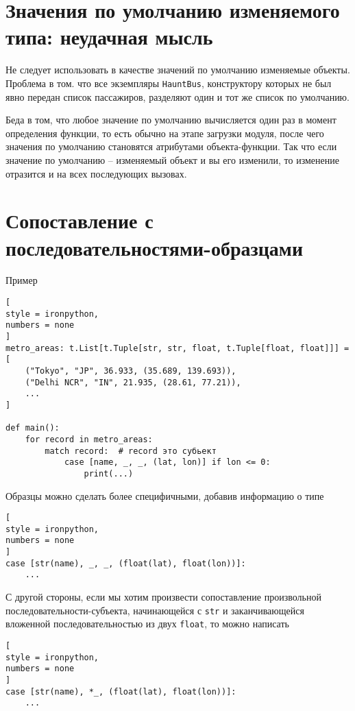 \documentclass[%
	11pt,
	a4paper,
	utf8,
		]{article}
\begin{document}
\section{Значения по умолчанию изменяемого типа: неудачная мысль}

Не следует использовать в качестве значений по умолчанию изменяемые объекты. Проблема в том. что все экземпляры \verb*|HauntBus|, конструктору которых не был явно передан список пассажиров, разделяют один и тот же список по умолчанию. 

Беда в том, что любое значение по умолчанию вычисляется один раз в момент определения функции, то есть обычно на этапе загрузки модуля, после чего значения по умолчанию становятся атрибутами объекта-функции. Так что если значение по умолчанию -- изменяемый объект и вы его изменили, то изменение отразится и на всех последующих вызовах.


\section{Сопоставление с последовательностями-образцами}

Пример
\begin{lstlisting}[
style = ironpython,
numbers = none
]
metro_areas: t.List[t.Tuple[str, str, float, t.Tuple[float, float]]] = [
    ("Tokyo", "JP", 36.933, (35.689, 139.693)),
    ("Delhi NCR", "IN", 21.935, (28.61, 77.21)),
    ...
]

def main():
    for record in metro_areas:
        match record:  # record это субьект
            case [name, _, _, (lat, lon)] if lon <= 0:
                print(...)
\end{lstlisting}

Образцы можно сделать более специфичными, добавив информацию о типе
\begin{lstlisting}[
style = ironpython,
numbers = none
]
case [str(name), _, _, (float(lat), float(lon))]:
    ...
\end{lstlisting}

С другой стороны, если мы хотим произвести сопоставление произвольной последовательности-субъекта, начинающейся с \verb|str| и заканчивающейся вложенной последовательностью из двух \verb*|float|, то можно написать
\begin{lstlisting}[
style = ironpython,
numbers = none
]
case [str(name), *_, (float(lat), float(lon))]:
    ...
\end{lstlisting}

\end{document}
